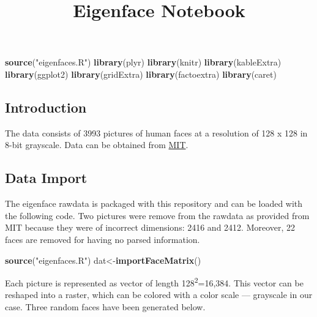 \documentclass[]{article}
\title{Eigenface Notebook}
\author{}
\date{}
\newenvironment{Shaded}{\begin{snugshade}}{\end{snugshade}}
\newcommand{\KeywordTok}[1]{\textcolor[rgb]{0.13,0.29,0.53}{\textbf{#1}}}
\newcommand{\StringTok}[1]{\textcolor[rgb]{0.31,0.60,0.02}{#1}}
\newcommand{\NormalTok}[1]{#1}
\begin{document}
\maketitle

\begin{Shaded}
\begin{Highlighting}[]
\KeywordTok{source}\NormalTok{(}\StringTok{"eigenfaces.R"}\NormalTok{)}
\KeywordTok{library}\NormalTok{(plyr)}
\KeywordTok{library}\NormalTok{(knitr)}
\KeywordTok{library}\NormalTok{(kableExtra)}
\KeywordTok{library}\NormalTok{(ggplot2)}
\KeywordTok{library}\NormalTok{(gridExtra)}
\KeywordTok{library}\NormalTok{(factoextra)}
\KeywordTok{library}\NormalTok{(caret)}
\end{Highlighting}
\end{Shaded}

\subsection{Introduction}\label{introduction}

The data consists of 3993 pictures of human faces at a resolution of 128
x 128 in 8-bit grayscale. Data can be obtained from
\href{http://courses.media.mit.edu/2004fall/mas622j/04.projects/faces/}{MIT}.

\subsection{Data Import}\label{data-import}

The eigenface rawdata is packaged with this repository and can be loaded
with the following code. Two pictures were remove from the rawdata as
provided from MIT because they were of incorrect dimensions: 2416 and
2412. Moreover, 22 faces are removed for having no parsed information.

\begin{Shaded}
\begin{Highlighting}[]
\KeywordTok{source}\NormalTok{(}\StringTok{"eigenfaces.R"}\NormalTok{)}
\NormalTok{dat<-}\KeywordTok{importFaceMatrix}\NormalTok{()}
\end{Highlighting}
\end{Shaded}

Each picture is represented as vector of length
128\textsuperscript{2}=16,384. This vector can be reshaped into a
raster, which can be colored with a color scale --- grayscale in our
case. Three random faces have been generated below.
\end{document}
